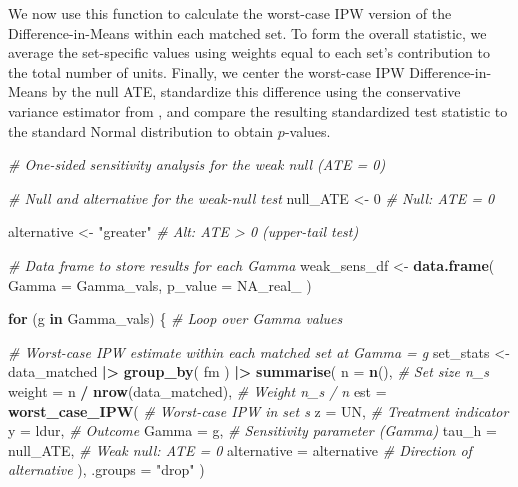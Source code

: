 \documentclass[
  12pt,
  leqno]{article}
\newenvironment{Shaded}{\begin{snugshade}}{\end{snugshade}}
\newcommand{\AttributeTok}[1]{\textcolor[rgb]{0.13,0.29,0.53}{#1}}
\newcommand{\CommentTok}[1]{\textcolor[rgb]{0.56,0.35,0.01}{\textit{#1}}}
\newcommand{\ConstantTok}[1]{\textcolor[rgb]{0.56,0.35,0.01}{#1}}
\newcommand{\ControlFlowTok}[1]{\textcolor[rgb]{0.13,0.29,0.53}{\textbf{#1}}}
\newcommand{\DecValTok}[1]{\textcolor[rgb]{0.00,0.00,0.81}{#1}}
\newcommand{\FunctionTok}[1]{\textcolor[rgb]{0.13,0.29,0.53}{\textbf{#1}}}
\newcommand{\NormalTok}[1]{#1}
\newcommand{\OtherTok}[1]{\textcolor[rgb]{0.56,0.35,0.01}{#1}}
\newcommand{\SpecialCharTok}[1]{\textcolor[rgb]{0.81,0.36,0.00}{\textbf{#1}}}
\newcommand{\StringTok}[1]{\textcolor[rgb]{0.31,0.60,0.02}{#1}}
\begin{document}
\doublespacing

We now use this function to calculate the worst-case IPW version of the
Difference-in-Means within each matched set. To form the overall
statistic, we average the set-specific values using weights equal to
each set's contribution to the total number of units. Finally, we center
the worst-case IPW Difference-in-Means by the null ATE, standardize this
difference using the conservative variance estimator from
\citet{fogarty2018}, and compare the resulting standardized test
statistic to the standard Normal distribution to obtain \(p\)-values.

\singlespacing

\begin{Shaded}
\begin{Highlighting}[]
\CommentTok{\# One{-}sided sensitivity analysis for the weak null (ATE = 0)}

\CommentTok{\# Null and alternative for the weak{-}null test}
\NormalTok{null\_ATE    }\OtherTok{\textless{}{-}} \DecValTok{0}                  \CommentTok{\# Null: ATE = 0}

\NormalTok{alternative }\OtherTok{\textless{}{-}} \StringTok{"greater"}          \CommentTok{\# Alt: ATE \textgreater{} 0 (upper{-}tail test)}

\CommentTok{\# Data frame to store results for each Gamma}
\NormalTok{weak\_sens\_df }\OtherTok{\textless{}{-}} \FunctionTok{data.frame}\NormalTok{(}
  \AttributeTok{Gamma   =}\NormalTok{ Gamma\_vals,}
  \AttributeTok{p\_value =} \ConstantTok{NA\_real\_}
\NormalTok{)}

\ControlFlowTok{for}\NormalTok{ (g }\ControlFlowTok{in}\NormalTok{ Gamma\_vals) \{ }\CommentTok{\# Loop over Gamma values}

  \CommentTok{\# Worst{-}case IPW estimate within each matched set at Gamma = g}
\NormalTok{  set\_stats }\OtherTok{\textless{}{-}}\NormalTok{ data\_matched }\SpecialCharTok{|\textgreater{}}
    \FunctionTok{group\_by}\NormalTok{(}
\NormalTok{      fm}
\NormalTok{    ) }\SpecialCharTok{|\textgreater{}}
    \FunctionTok{summarise}\NormalTok{(}
      \AttributeTok{n      =} \FunctionTok{n}\NormalTok{(),                        }\CommentTok{\# Set size n\_s}
      \AttributeTok{weight =}\NormalTok{ n }\SpecialCharTok{/} \FunctionTok{nrow}\NormalTok{(data\_matched),     }\CommentTok{\# Weight n\_s / n}
      \AttributeTok{est    =} \FunctionTok{worst\_case\_IPW}\NormalTok{(             }\CommentTok{\# Worst{-}case IPW in set s}
        \AttributeTok{z           =}\NormalTok{ UN,                  }\CommentTok{\# Treatment indicator}
        \AttributeTok{y           =}\NormalTok{ ldur,                }\CommentTok{\# Outcome}
        \AttributeTok{Gamma       =}\NormalTok{ g,                   }\CommentTok{\# Sensitivity parameter (Gamma)}
        \AttributeTok{tau\_h       =}\NormalTok{ null\_ATE,            }\CommentTok{\# Weak null: ATE = 0}
        \AttributeTok{alternative =}\NormalTok{ alternative          }\CommentTok{\# Direction of alternative}
\NormalTok{      ),}
      \AttributeTok{.groups =} \StringTok{"drop"}
\NormalTok{    )}


\end{Highlighting}
\end{Shaded}
\end{document}
